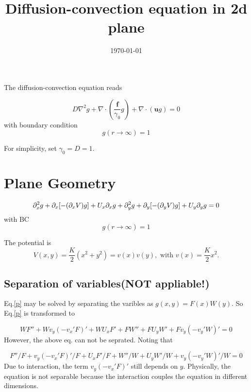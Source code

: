 \documentclass{../templetes/1c}
\begin{document}
\title {Diffusion-convection equation in 2d plane}
\date{\today}
\maketitle

The diffusion-convection equation reads

\begin{equation}
D\nabla^2g+\nabla\cdot(\frac{\bm{f}}{\gamma_0}g)
+\nabla\cdot(\bm{u}g)=0
\end{equation}
with boundary condition
\begin{equation}
g(r\rightarrow\infty )=1
\end{equation}

For simplicity, set $\gamma_0=D=1
$.


\section{Plane Geometry}

\begin{equation} \label{p}
\partial_x^2g+\partial_x[-(\partial_xV)g]
+U_x\partial_xg+\partial_y^2g+\partial_y[-(\partial_yV)g]+U_y\partial_yg=0
\end{equation}
with BC
\begin{equation}
g(r\rightarrow\infty)=1
\end{equation}

The potential is
\begin{equation}
V(x,y)=\frac{K}{2}(x^2+y^2)=v(x)v(y), \mbox{ with } v(x)=\frac{K}{2}x^2.
\end{equation}

\subsection{Separation of variables(NOT appliable!)}
Eq.\eqref{p} may be solved by separating the varibles as $g(x,y)=F(x)W(y)$.
So Eq.\eqref{p} is transformed to

\begin{equation}
    WF''+Wv_y(-v_x'F)'+WU_xF'+
    FW''+FU_yW'+Fv_y(-v_y'W)'=0
\end{equation}
However, the above eq. can not be seprated.
Noting that

\begin{equation}
    F''/F+v_y(-v_x'F)'/F+U_xF'/F+
    W''/W+U_yW'/W+v_y(-v_y'W)'/W=0
\end{equation}
Due to interaction, the term $v_y(-v_x'F)'$
still depends on $y$. Physically, the equation is
not separable because the interaction couples the
equation in different dimensions.
\end{document}
